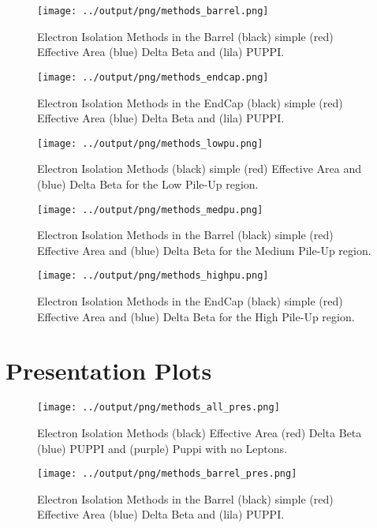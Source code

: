 \documentclass[11pt]{book}
\begin{document}
\begin{figure}[ht]
\centering
\texttt{[image: ../output/png/methods\_barrel.png]}
\caption{Electron Isolation Methods in the Barrel (black) simple (red) Effective Area (blue) Delta Beta and (lila) PUPPI.}
\label{fig:methods_barrel}
\end{figure}

\begin{figure}[ht]
\centering
\texttt{[image: ../output/png/methods\_endcap.png]}
\caption{Electron Isolation Methods in the EndCap (black) simple (red) Effective Area (blue) Delta Beta and (lila) PUPPI.}
\label{fig:methods_endcap}
\end{figure}


\begin{figure}[ht]
\centering
\texttt{[image: ../output/png/methods\_lowpu.png]}
\caption{Electron Isolation Methods (black) simple (red) Effective Area and (blue) Delta Beta for the Low Pile-Up region.}
\label{fig:methods_lowpu}
\end{figure}

\begin{figure}[ht]
\centering
\texttt{[image: ../output/png/methods\_medpu.png]}
\caption{Electron Isolation Methods in the Barrel (black) simple (red) Effective Area and (blue) Delta Beta for the Medium Pile-Up region.}
\label{fig:methods_medpu}
\end{figure}

\begin{figure}[ht]
\centering
\texttt{[image: ../output/png/methods\_highpu.png]}
\caption{Electron Isolation Methods in the EndCap (black) simple (red) Effective Area and (blue) Delta Beta for the High Pile-Up region.}
\label{fig:methods_highpu}
\end{figure}
\clearpage

\section{Presentation Plots}
\begin{figure}[ht]
\centering
\texttt{[image: ../output/png/methods\_all\_pres.png]}
\caption{Electron Isolation Methods (black) Effective Area (red) Delta Beta (blue) PUPPI and (purple) Puppi with no Leptons.}
\label{fig:methods_all_pres}
\end{figure}

\begin{figure}[ht]
\centering
\texttt{[image: ../output/png/methods\_barrel\_pres.png]}
\caption{Electron Isolation Methods in the Barrel (black) simple (red) Effective Area (blue) Delta Beta and (lila) PUPPI.}
\label{fig:methods_barrel_pres}
\end{figure}
\end{document}
